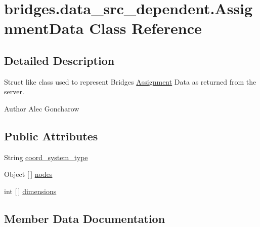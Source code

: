 \hypertarget{classbridges_1_1data__src__dependent_1_1_assignment_data}{}\section{bridges.\+data\+\_\+src\+\_\+dependent.\+Assignment\+Data Class Reference}
\label{classbridges_1_1data__src__dependent_1_1_assignment_data}


\subsection{Detailed Description}
Struct like class used to represent Bridges \hyperlink{classbridges_1_1data__src__dependent_1_1_assignment}{Assignment} Data as returned from the server. 

\begin{DoxyAuthor}{Author}
Alec Goncharow 
\end{DoxyAuthor}
\subsection*{Public Attributes}
\begin{DoxyCompactItemize}
\item 
String \hyperlink{classbridges_1_1data__src__dependent_1_1_assignment_data_a6734aba0f017aca0024fcd80905be4f4}{coord\+\_\+system\+\_\+type}
\item 
Object \mbox{[}$\,$\mbox{]} \hyperlink{classbridges_1_1data__src__dependent_1_1_assignment_data_a1d7c23816a57cf9b3bd1bc0b53f15e8e}{nodes}
\item 
int \mbox{[}$\,$\mbox{]} \hyperlink{classbridges_1_1data__src__dependent_1_1_assignment_data_ab4aa179a24395748542f6fb64307132c}{dimensions}
\end{DoxyCompactItemize}


\subsection{Member Data Documentation}
\mbox{\label{classbridges_1_1data__src__dependent_1_1_assignment_data_a6734aba0f017aca0024fcd80905be4f4}} 
